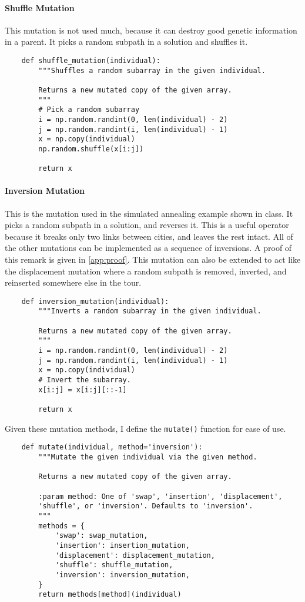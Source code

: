 \documentclass{article}
\begin{document}
\paragraph{Shuffle Mutation} This mutation is not used much, because it can destroy good genetic
information in a parent. It picks a random subpath in a solution and shuffles it.
\begin{verbatim}
    def shuffle_mutation(individual):
        """Shuffles a random subarray in the given individual.

        Returns a new mutated copy of the given array.
        """
        # Pick a random subarray
        i = np.random.randint(0, len(individual) - 2)
        j = np.random.randint(i, len(individual) - 1)
        x = np.copy(individual)
        np.random.shuffle(x[i:j])

        return x
\end{verbatim}

\paragraph{Inversion Mutation} This is the mutation used in the simulated annealing example shown
in class. It picks a random subpath in a solution, and reverses it. This is a useful operator
because it breaks only two links between cities, and leaves the rest intact. All of the other
mutations can be implemented as a sequence of inversions. A proof of this remark is given in
\autoref{app:proof}. This mutation can also be extended to act like the displacement mutation where
a random subpath is removed, inverted, and reinserted somewhere else in the tour.
\begin{verbatim}
    def inversion_mutation(individual):
        """Inverts a random subarray in the given individual.

        Returns a new mutated copy of the given array.
        """
        i = np.random.randint(0, len(individual) - 2)
        j = np.random.randint(i, len(individual) - 1)
        x = np.copy(individual)
        # Invert the subarray.
        x[i:j] = x[i:j][::-1]

        return x
\end{verbatim}

Given these mutation methods, I define the \texttt{mutate()} function for ease of use.

\begin{verbatim}
    def mutate(individual, method='inversion'):
        """Mutate the given individual via the given method.

        Returns a new mutated copy of the given array.

        :param method: One of 'swap', 'insertion', 'displacement',
        'shuffle', or 'inversion'. Defaults to 'inversion'.
        """
        methods = {
            'swap': swap_mutation,
            'insertion': insertion_mutation,
            'displacement': displacement_mutation,
            'shuffle': shuffle_mutation,
            'inversion': inversion_mutation,
        }
        return methods[method](individual)
\end{verbatim}
\end{document}
